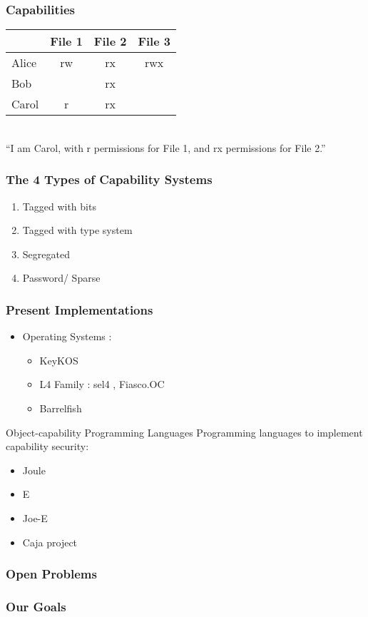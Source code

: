 \documentclass[xcolor=table]{beamer}
\begin{document}
\begin{frame}
  \frametitle{Capabilities}
  \begin{center}
    \begin{tabular}{|l||c|c|c|}
      \hline
      &File 1&File 2&File 3\\
      \hline
      \hline
      Alice&rw&rx&rwx\\
      \hline
      Bob&&rx&\\
      \hline
      \cellcolor{green}Carol&\cellcolor{green}r&\cellcolor{green}rx&\cellcolor{green}\\
      \hline
    \end{tabular}\\
    \vspace{10pt}
    ``I am Carol, with r permissions for File 1, and rx permissions for File 2.''
  \end{center}
\end{frame}

\begin{frame}
  \frametitle{The 4 Types of Capability Systems}
  
\begin{enumerate}
    \item{Tagged with bits}
    \item{Tagged with type system}
    \item{Segregated}
    \item{Password/ Sparse}
\end{enumerate}
 \end{frame}

\begin{frame}
    \frametitle{Present Implementations}
     \begin{itemize}
         \item Operating Systems :
         \begin{itemize}
             \item KeyKOS
             \item L4 Family : sel4 , Fiasco.OC
             \item Barrelfish
         \end{itemize}
     \end{itemize}
\end{frame}

\begin{frame}{Object-capability Programming Languages}
Programming languages to implement capability security:
\begin{itemize}
    \item Joule
    \item E
    \item Joe-E
    \item Caja project
\end{itemize}
\end{frame}

\begin{frame}
  \frametitle{Open Problems}
\end{frame}

\begin{frame}
  \frametitle{Our Goals}
\end{frame}
\end{document}
